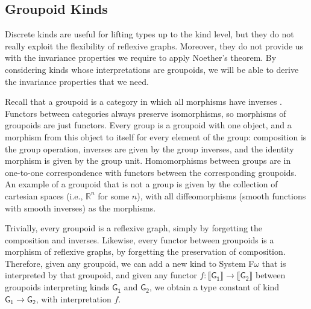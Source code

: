 \documentclass{sigplanconf}
\theoremstyle{examplestyle}
\newcommand{\sem}[1]{\llbracket #1 \rrbracket}
\begin{document}
\subsection{Groupoid Kinds}
\label{sec:groupoid-kinds}

Discrete kinds are useful for lifting types up to the kind level, but
they do not really exploit the flexibility of reflexive
graphs. Moreover, they do not provide us with the invariance
properties we require to apply Noether's theorem. By considering kinds
whose interpretations are groupoids, we will be able to derive the
invariance properties that we need.

Recall that a groupoid is a category in which all morphisms have
inverses \cite{maclane98categories}. Functors between categories
always preserve isomorphisms, so morphisms of groupoids are just
functors. Every group is a groupoid with one object, and a morphism
from this object to itself for every element of the group: composition
is the group operation, inverses are given by the group inverses, and
the identity morphism is given by the group unit. Homomorphisms
between groups are in one-to-one correspondence with functors between
the corresponding groupoids. An example of a groupoid that is not a
group is given by the collection of cartesian spaces (i.e.,
$\mathbb{R}^n$ for some $n$), with all diffeomorphisms (smooth
functions with smooth inverses) as the morphisms.

Trivially, every groupoid is a reflexive graph, simply by forgetting
the composition and inverses. Likewise, every functor between
groupoids is a morphism of reflexive graphs, by forgetting the
preservation of composition. Therefore, given any groupoid, we can add
a new kind to System F$\omega$ that is interpreted by that groupoid,
and given any functor $f : \sem{\mathsf{G_1}} \to \sem{\mathsf{G_2}}$
between groupoids interpreting kinds $\mathsf{G_1}$ and
$\mathsf{G_2}$, we obtain a type constant of kind $\mathsf{G_1} \to
\mathsf{G_2}$, with interpretation $f$.
\end{document}
